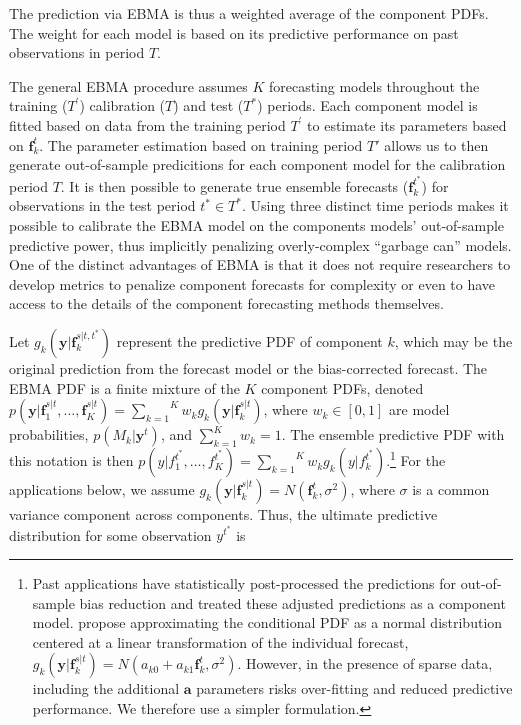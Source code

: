 \documentclass[12pt,fullpage,endnotes]{article}
\begin{document}
The prediction via EBMA is thus a weighted average of the component PDFs. The weight for each model is based on its predictive performance on past observations in period $T$. 

The general EBMA procedure assumes $K$ forecasting models throughout the
training ($T^{\prime}$) calibration ($T$) and test ($T^\ast$)
periods. Each component model is fitted based on data from the
training period $T^\prime$ to estimate its parameters based on $\mathbf{f}^{t}_k$. The parameter estimation based on training period $T{\prime}$ allows us to then generate out-of-sample predicitions for each component model for the calibration period $T$. It is then possible to generate
true ensemble forecasts ($\mathbf{f}_k^{t^\ast}$) for observations in
the test period $t^\ast \in T^*$. Using three distinct time periods makes it possible to calibrate the EBMA model on the components models' out-of-sample predictive power, thus implicitly
penalizing overly-complex ``garbage can'' models. One of the distinct
advantages of EBMA is that it does not require researchers to develop
metrics to penalize component forecasts for complexity or even to have
access to the details of the component forecasting methods themselves.

Let $g_k(\mathbf{y}|\mathbf{f}_k^{s|t, t^\ast})$ represent the
predictive PDF of component $k$, which may be the original prediction
from the forecast model or the bias-corrected forecast.  The EBMA PDF
is a finite mixture of the $K$ component PDFs, denoted
$p(\mathbf{y}|\mathbf{f}_1^{s|t}, \ldots,
\mathbf{f}_K^{s|t})=\overset{K}{\underset{k=1}{\sum}} w_k
g_k(\mathbf{y}|\mathbf{f}_k^{s|t})$, where $w_k \in [0,1]$ are model
probabilities, $p(M_k|\mathbf{y}^t)$, and $\sum_{k=1}^Kw_k=1$. The
ensemble predictive PDF with this notation is then
$p(y|f_{1}^{t^\ast}, \ldots,
f_{K}^{t^\ast})=\overset{K}{\underset{k=1}{\sum}} w_k
g_k(y|f_{k}^{t^*})$.\footnote{Past applications have statistically
  post-processed the predictions for out-of-sample bias reduction and
  treated these adjusted predictions as a component
  model. \citet{Raftery:2005} propose approximating the conditional
  PDF as a normal distribution centered at a linear transformation of
  the individual forecast, $g_k(\mathbf{y}|\mathbf{f}_k^{s|t}) =
  N(a_{k0} + a_{k1}\mathbf{f}_k^{t}, \sigma^2)$. However, in the
  presence of sparse data, including the additional $\mathbf{a}$
  parameters risks over-fitting and reduced predictive performance.
  We therefore use a simpler formulation.}
For the applications below, we assume
$g_k(\mathbf{y}|\mathbf{f}_k^{s|t}) = N(\mathbf{f}_k^{t}, \sigma^2)$,
where $\sigma$ is a common variance component across components.
Thus, the ultimate predictive distribution for some observation
$y^{t^\ast}$ is
\end{document}
